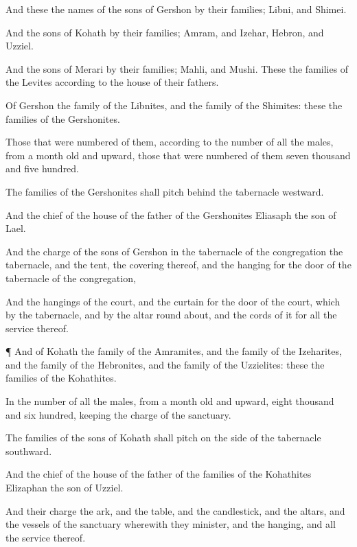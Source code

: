 {And these
{} the
names of the
sons of
Gershon by their
families;
Libni, and
Shimei.

And the
sons of
Kohath by their
families;
Amram, and
Izehar,
Hebron, and
Uzziel.

And the
sons of
Merari by their
families;
Mahli, and
Mushi. These
{} the
families of the
Levites according to the
house of their
fathers.

Of
Gershon
{} the
family of the
Libnites, and the
family of the
Shimites: these
{} the
families of the
Gershonites.

Those that were
numbered of them, according to the
number of all the
males, from a
month
old and
upward,
{} those that were
numbered of them
{}
seven
thousand and
five
hundred.

The
families of the
Gershonites shall
pitch
behind the
tabernacle
westward.

And the
chief of the
house of the
father of the
Gershonites
{}
Eliasaph the
son of
Lael.

And the
charge of the
sons of
Gershon in the
tabernacle of the
congregation
{} the
tabernacle, and the
tent, the
covering thereof, and the
hanging for the
door of the
tabernacle of the
congregation,

And the
hangings of the
court, and the
curtain for the
door of the
court, which
{} by the
tabernacle, and by the
altar round
about, and the
cords of it for all the
service thereof.


\par }{\PP {}¶ And of
Kohath
{} the
family of the
Amramites, and the
family of the
Izeharites, and the
family of the
Hebronites, and the
family of the
Uzzielites: these
{} the
families of the
Kohathites.

In the
number of all the
males, from a
month
old and
upward,
{}
eight
thousand and
six
hundred,
keeping the
charge of the
sanctuary.

The
families of the
sons of
Kohath shall
pitch on the
side of the
tabernacle
southward.

And the
chief of the
house of the
father of the
families of the
Kohathites
{}
Elizaphan the
son of
Uzziel.

And their
charge
{} the
ark, and the
table, and the
candlestick, and the
altars, and the
vessels of the
sanctuary wherewith they
minister, and the
hanging, and all the
service thereof.

}
